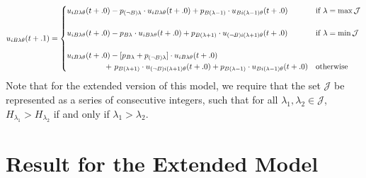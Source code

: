 \documentclass[a4paper,8pt]{extarticle}
\begin{document}
\[
    u_{iB\lambda\theta}(t+.1)
        =
    \begin{cases}
        u_{iB\lambda\theta}(t+.0)
        -
        p_{(\lnot B) \lambda}
        \cdot 
        u_{iB\lambda\theta}(t+.0)
        +
        p_{B(\lambda-1)}
        \cdot 
        u_{Bi(\lambda-1)\theta}(t+.0)
        & \text{if $\lambda=\max \mathcal J$}
        \\
        \\
        u_{iB\lambda\theta}(t+.0)
        -
        p_{B\lambda}
        \cdot 
        u_{iB\lambda\theta}(t+.0)
        +
        p_{B(\lambda+1)}
        \cdot 
        u_{(\lnot B)i(\lambda+1)\theta}(t+.0)
        &
        \text{if $\lambda=\min \mathcal J$}
        \\
        \\
        u_{iB\lambda\theta}(t+.0)
        -
        [p_{B\lambda}+p_{(\lnot B)\lambda}]
        \cdot 
        u_{iB\lambda\theta}(t+.0)
        \\
        \hspace{1.75cm} +\ p_{B(\lambda+1)}
        \cdot 
        u_{(\lnot B)i(\lambda+1)\theta}(t+.0)
        +
        p_{B(\lambda-1)}
        \cdot 
        u_{Bi(\lambda-1)\theta}(t+.0)
        &
        \text{otherwise}
    \end{cases}
\]
Note that for the extended version of this model, we require that the set $\mathcal J$ be represented as a series of consecutive integers, such that for all $\lambda_1,\lambda_2\in\mathcal J$, $H_{\lambda_1}>H_{\lambda_2}$ if and only if $\lambda_1>\lambda_2$.


\section{Result for the Extended Model}
\end{document}
